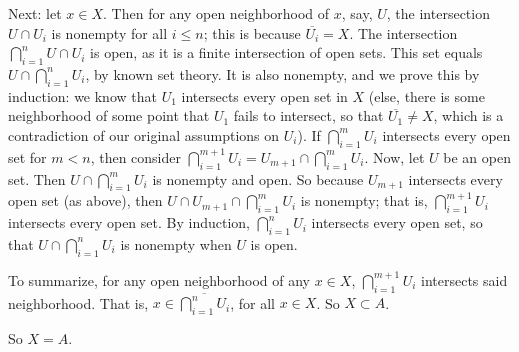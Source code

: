 \documentclass[a4paper,12pt]{article}
\begin{document}
Next: let $x \in X$. Then for any open neighborhood of $x$, say, $U$, the intersection $U \cap U_i$ is nonempty for all $i \leq n$; this is because $\overline{U_i} = X$. The intersection $\bigcap\limits_{i=1}^n U \cap U_i$ is open, as it is a finite intersection of open sets. This set equals $U \cap \bigcap\limits_{i=1}^n U_i$, by known set theory. It is also nonempty, and we prove this by induction: we know that $U_1$ intersects every open set in $X$ (else, there is some neighborhood of some point that $U_1$ fails to intersect, so that $\overline{U_1} \neq X$, which is a contradiction of our original assumptions on $U_i$). If $\bigcap\limits_{i=1}^m U_i$ intersects every open set for $m < n$, then consider $\bigcap\limits_{i=1}^{m+1} U_i = U_{m+1} \cap \bigcap\limits_{i=1}^m U_i$. Now, let $U$ be an open set. Then $U \cap \bigcap\limits_{i=1}^m U_i$ is nonempty and open. So because $U_{m+1}$ intersects every open set (as above), then $U\cap U_{m+1} \cap \bigcap\limits_{i=1}^m U_i$ is nonempty; that is, $\bigcap\limits_{i=1}^{m+1} U_i$ intersects every open set. By induction, $\bigcap\limits_{i=1}^{n} U_i$ intersects every open set, so that $U \cap \bigcap\limits_{i=1}^{n} U_i$ is nonempty when $U$ is open.

To summarize, for any open neighborhood of any $x \in X$, $\bigcap\limits_{i=1}^{m+1} U_i$ intersects said neighborhood. That is, $x \in \overline{\bigcap\limits_{i=1}^n U_i}$, for all $x \in X$. So $X \subset A$.

So $X = A$. 

\shunt
\end{document}
